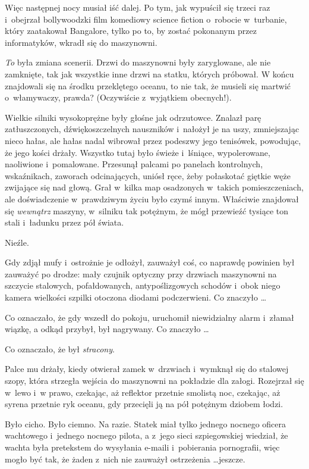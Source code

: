 \documentclass[oneside,polish,11pt,rmheadings]{mwbk}
\begin{document}
Więc następnej nocy musiał iść dalej. Po tym, jak wypuścił się trzeci raz i~obejrzał bollywoodzki film komediowy science fiction o~robocie w~turbanie, który zaatakował Bangalore, tylko po to, by zostać pokonanym przez informatyków, wkradł się do maszynowni.

\textit{To }była zmiana scenerii. Drzwi do maszynowni były zaryglowane, ale nie zamknięte, tak jak wszystkie inne drzwi na statku, których próbował. W końcu znajdowali się na środku przeklętego oceanu, to nie tak, że musieli się martwić o~włamywaczy, prawda? (Oczywiście z~wyjątkiem obecnych!).

Wielkie silniki wysokoprężne były głośne jak odrzutowce. Znalazł parę zatłuszczonych, dźwiękoszczelnych nauszników i~nałożył je na uszy, zmniejszając nieco hałas, ale hałas nadal wibrował przez podeszwy jego tenisówek, powodując, że jego kości drżały. Wszystko tutaj było świeże i~lśniące, wypolerowane, naoliwione i~pomalowane. Przesunął palcami po panelach kontrolnych, wskaźnikach, zaworach odcinających, uniósł ręce, żeby połaskotać giętkie węże zwijające się nad głową. Grał w~kilka map osadzonych w~takich pomieszczeniach, ale doświadczenie w~prawdziwym życiu było czymś innym. Właściwie znajdował się \textit{wewnątrz }maszyny, w~silniku tak potężnym, że mógł przewieźć tysiące ton stali i~ładunku przez pół świata.

Nieźle.

Gdy zdjął mufy i~ostrożnie je odłożył, zauważył coś, co naprawdę powinien był zauważyć po drodze: mały czujnik optyczny przy drzwiach maszynowni na szczycie stalowych, pofałdowanych, antypoślizgowych schodów i~obok niego kamera wielkości szpilki otoczona diodami podczerwieni. Co znaczyło \ldots 

Co oznaczało, że gdy wszedł do pokoju, uruchomił niewidzialny alarm i~złamał wiązkę, a odkąd przybył, był nagrywany. Co znaczyło \ldots 

Co oznaczało, że był \textit{stracony}.

Palce mu drżały, kiedy otwierał zamek w~drzwiach i~wymknął się do stalowej szopy, która strzegła wejścia do maszynowni na pokładzie dla załogi. Rozejrzał się w~lewo i~w prawo, czekając, aż reflektor przetnie smolistą noc, czekając, aż syrena przetnie ryk oceanu, gdy przecięli ją na pół potężnym dziobem łodzi.

Było cicho. Było ciemno. Na razie. Statek miał tylko jednego nocnego oficera wachtowego i~jednego nocnego pilota, a z~jego sieci szpiegowskiej wiedział, że wachta była pretekstem do wysyłania e-maili i~pobierania pornografii, więc mogło być tak, że żaden z~nich nie zauważył ostrzeżenia \ldots  jeszcze.
\end{document}
